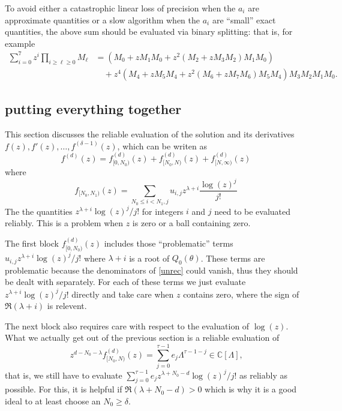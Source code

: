 \documentclass[12pt]{article}
\numberwithin{equation}{section}
\begin{document}
To avoid either a catastrophic linear loss of precision when the $a_i$ are approximate quantities or a slow algorithm when the $a_i$ are ``small'' exact quantities, the above sum should be evaluated via binary splitting: that is, for example
\begin{align*}
\sum_{i=0}^{7} z^{i} \prod_{i\ge \ell \ge 0}M_{\ell} &= (M_0 + z M_1 M_0 + z^2(M_2 + z M_3 M_2) M_1 M_0)\\
& \quad + z^4 (M_4 + z M_5 M_4 + z^2(M_6 + z M_7 M_6) M_5 M_4)M_3 M_2 M_1 M_0\text{.}
\end{align*}

\subsection{putting everything together}
This section discusses the reliable evaluation of the solution and its derivatives $f(z), f'(z), \dots, f^{(\delta-1)}(z)$, which can be writen as
\begin{equation*}
f^{(d)}(z) = f_{[0,N_0)}^{(d)}(z) + f_{[N_0,N)}^{(d)}(z) + f_{[N,\infty)}^{(d)}(z)
\end{equation*}
where 
\begin{equation*}
f_{[N_0,N_1)}(z) = \sum_{N_0 \le i < N_1,j} u_{i,j} z^{\lambda+i} \frac{\log(z)^j}{j!}
\end{equation*}
The the quantities $z^{\lambda+i} \log(z)^j/j!$ for integers $i$ and $j$ need to be evaluated reliably. This is a problem when $z$ is zero or a ball containing zero.

The first block $f_{[0,N_0)}^{(d)}(z)$ includes those ``problematic'' terms $u_{i,j} z^{\lambda+i} \log(z)^j/j!$ where $\lambda+i$ is a root of $Q_0(\theta)$. These terms are problematic because the denominators of \eqref{unrec} could vanish, thus they should be dealt with separately. For each of these terms we just evaluate $z^{\lambda+i} \log(z)^j/j!$ directly and take care when $z$ contains zero, where the sign of $\Re(\lambda+i)$ is relevent.

The next block also requires care with respect to the evaluation of $\log(z)$. What we actually get out of the previous section is a reliable evaluation of
\begin{equation*}
z^{d - N_0 - \lambda} f_{[N_0,N)}^{(d)}(z) = \sum_{j=0}^{\tau-1} e_j \Lambda^{\tau-1-j} \in \mathbb{C}[\Lambda]\text{,}
\end{equation*}
that is, we still have to evaluate $\sum_{j=0}^{\tau-1} e_j z^{\lambda+N_0-d}\log(z)^j/j!$ as reliably as possible. For this, it is helpful if $\Re(\lambda+N_0-d) > 0$ which is why it is a good ideal to at least choose an $N_0 \ge \delta$.
\end{document}
